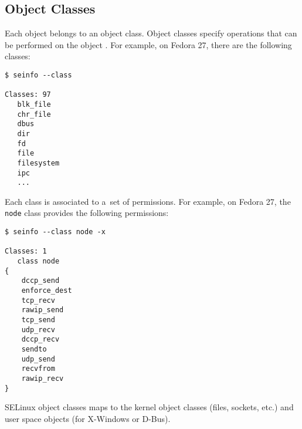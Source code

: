 \subsection{Object Classes}
Each object belongs to an object class. Object classes specify operations that
can be performed on the object \cite[pp.~29--30]{tsn}. For example, on Fedora
27, there are the following classes:
\begin{lstlisting}
$ seinfo --class

Classes: 97
   blk_file
   chr_file
   dbus
   dir
   fd
   file
   filesystem
   ipc
   ...
\end{lstlisting}

Each class is associated to a~set of permissions. For example, on Fedora 27,
the \texttt{node} class provides the following permissions:
\begin{lstlisting}
$ seinfo --class node -x

Classes: 1
   class node
{
	dccp_send
	enforce_dest
	tcp_recv
	rawip_send
	tcp_send
	udp_recv
	dccp_recv
	sendto
	udp_send
	recvfrom
	rawip_recv
}
\end{lstlisting}
SELinux object classes maps to the kernel object classes (files, sockets, etc.)
and user space objects (for X-Windows or D-Bus).

